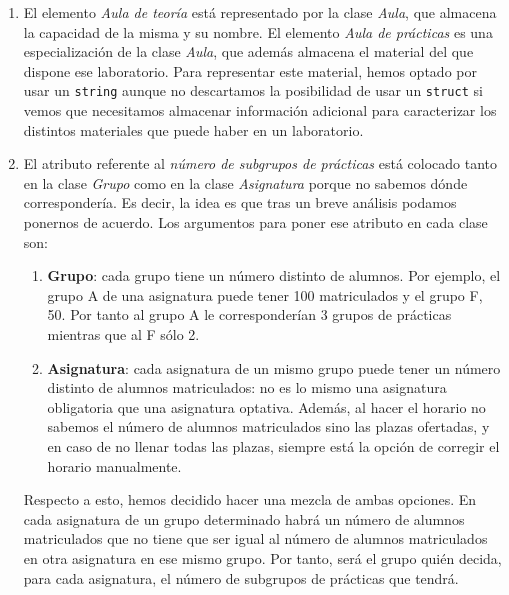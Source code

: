 \begin{enumerate}[$\bullet$]
    \item El elemento \textit{Aula de teoría} está representado por la clase \textit{Aula}, que almacena la capacidad de la misma y su nombre. El elemento \textit{Aula de prácticas} es una especialización de la clase \textit{Aula}, que además almacena el material del que dispone ese laboratorio. Para representar este material, hemos optado por usar un \texttt{string} aunque no descartamos la posibilidad de usar un \texttt{struct} si vemos que necesitamos almacenar información adicional para caracterizar los distintos materiales que puede haber en un laboratorio.

    \item El atributo referente al \textit{número de subgrupos de prácticas} está colocado tanto en la clase \textit{Grupo} como en la clase \textit{Asignatura} porque no sabemos dónde correspondería. Es decir, la idea es que tras un breve análisis podamos ponernos de acuerdo. Los argumentos para poner ese atributo en cada clase son:
    \begin{enumerate}[---]
        \item \textbf{Grupo}: cada grupo tiene un número distinto de alumnos. Por ejemplo, el grupo A de una asignatura puede tener 100 matriculados y el grupo F, 50. Por tanto al grupo A le corresponderían 3 grupos de prácticas mientras que al F sólo 2.
        \item \textbf{Asignatura}: cada asignatura de un mismo grupo puede tener un número distinto de alumnos matriculados: no es lo mismo una asignatura obligatoria que una asignatura optativa. Además, al hacer el horario no sabemos el número de alumnos matriculados sino las plazas ofertadas, y en caso de no llenar todas las plazas, siempre está la opción de corregir el horario manualmente.
    \end{enumerate}
    Respecto a esto, hemos decidido hacer una mezcla de ambas opciones. En cada asignatura de un grupo determinado habrá un número de alumnos matriculados que no tiene que ser igual al número de alumnos matriculados en otra asignatura en ese mismo grupo. Por tanto, será el grupo quién decida, para cada asignatura, el número de subgrupos de prácticas que tendrá.
\end{enumerate} 
